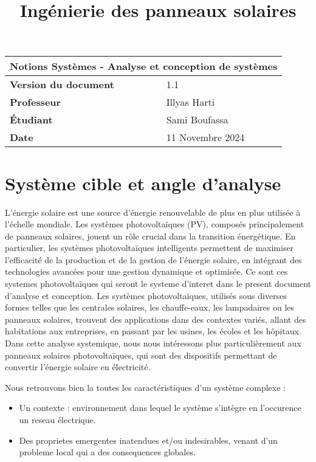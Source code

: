 \documentclass{article}
\title{Ingénierie des panneaux solaires}
\author{}
\date{\vspace{-5ex}}
\begin{document}
\maketitle

\begin{center}
    \begin{tabular}{|l|l|}
        \hline
        \multicolumn{2}{|c|}{\textbf{Notions Systèmes - Analyse et conception de systèmes}} \\
        \hline
        \textbf{Version du document} & 1.1 \\
        \hline
        \textbf{Professeur} & Illyas Harti\\
        \hline
        \textbf{Étudiant} & Sami Boufassa\\
                            
        \hline
        \textbf{Date} & 11 Novembre 2024 \\
        \hline
    \end{tabular}
\end{center}

\tableofcontents

\newpage

\section{Système cible et angle d'analyse}
L'énergie solaire est une source d'énergie renouvelable de plus en plus utilisée à l'échelle mondiale. Les systèmes photovoltaïques (PV), composés principalement de panneaux solaires, jouent un rôle crucial dans la transition énergétique. En particulier, les systèmes photovoltaïques intelligents permettent de maximiser l'efficacité de la production et de la gestion de l'énergie solaire, en intégrant des technologies avancées pour une gestion dynamique et optimisée.
Ce sont ces systemes photovoltaïques qui seront le systeme d'interet dans le present document d'analyse et conception. Les systèmes photovoltaïques, utilisés sous diverses formes telles que les centrales solaires, les chauffe-eaux, les lampadaires ou les panneaux solaires, trouvent des applications dans des contextes variés, allant des habitations aux entreprises, en passant par les usines, les écoles et les hôpitaux. Dans cette analyse systemique, nous nous intéressons plus particulièrement aux panneaux solaires photovoltaïques, qui sont des dispositifs permettant de convertir l'énergie solaire en électricité.


Nous retrouvons bien la toutes les caractéristiques d'un système complexe : 
\begin{itemize}
    \item Un contexte : environnement dans lequel le système s'intègre en l'occurence un reseau électrique. 
    \item Des proprietes emergentes inatendues et/ou indesirables, venant d'un probleme local qui a des consequences globales.

\end{itemize} 
\end{document}
